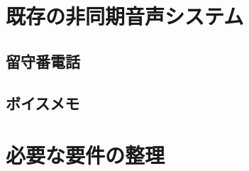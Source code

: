 \documentclass[submit,techrep,noauthor]{ipsj}
\def\|{\verb|}
\begin{document}
%3
\section{既存の非同期音声システム}

% \label{sec:format}
% 以下，情報処理学会論文誌ジャーナル用スタイルファイルを用いた論文フォーマットの指針について述べるので，
% これに従って原稿を用意頂きたい．
% \LaTeX を用いた一般的な文章作成技術については，
% \cite{okumura, companion} 等を参考にされたい．


% 3.1
\subsection{留守番電話}

% 3.2
\subsection{ボイスメモ}

%4
\section{必要な要件の整理}
% \label{config}
% ファイルは次のようになる．下線部は投稿時に省略可能なもの．

% 4.1
% \subsection{表題・著者名等}

%  表題，著者名とその所属，および概要を前述のコマンドや環境により{\bf 和文と
%  英文の双方について}定義した後，\|\maketitle| によって出力する．






\end{document}
